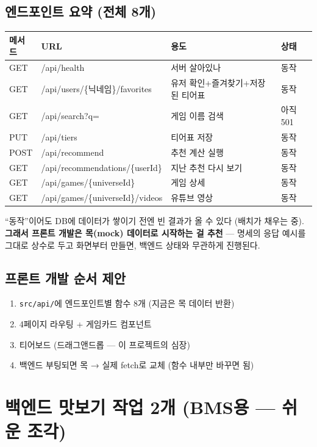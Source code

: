 \documentclass[11pt]{article}
\begin{document}
\subsection{엔드포인트 요약 (전체 8개)}
\begin{center}
\small
\begin{tabular}{llll}
\toprule
메서드 & URL & 용도 & 상태 \\
\midrule
GET & /api/health & 서버 살아있나 & 동작 \\
GET & /api/users/\{닉네임\}/favorites & 유저 확인+즐겨찾기+저장된 티어표 & 동작 \\
GET & /api/search?q= & 게임 이름 검색 & 아직 501 \\
PUT & /api/tiers & 티어표 저장 & 동작 \\
POST & /api/recommend & 추천 계산 실행 & 동작 \\
GET & /api/recommendations/\{userId\} & 지난 추천 다시 보기 & 동작 \\
GET & /api/games/\{universeId\} & 게임 상세 & 동작 \\
GET & /api/games/\{universeId\}/videos & 유튜브 영상 & 동작 \\
\bottomrule
\end{tabular}
\end{center}

``동작''이어도 DB에 데이터가 쌓이기 전엔 빈 결과가 올 수 있다 (배치가 채우는 중).
\textbf{그래서 프론트 개발은 목(mock) 데이터로 시작하는 걸 추천} --- 명세의 응답 예시를
그대로 상수로 두고 화면부터 만들면, 백엔드 상태와 무관하게 진행된다.

\subsection{프론트 개발 순서 제안}
\begin{enumerate}
  \item \texttt{src/api/}에 엔드포인트별 함수 8개 (지금은 목 데이터 반환)
  \item 4페이지 라우팅 + 게임카드 컴포넌트
  \item 티어보드 (드래그앤드롭 --- 이 프로젝트의 심장)
  \item 백엔드 부팅되면 목 → 실제 fetch로 교체 (함수 내부만 바꾸면 됨)
\end{enumerate}

\section{백엔드 맛보기 작업 2개 (BMS용 --- 쉬운 조각)}
\end{document}
